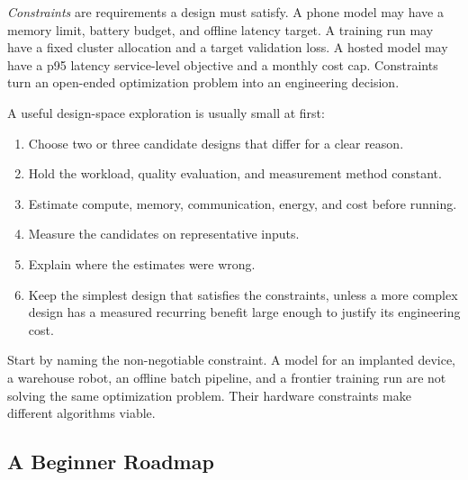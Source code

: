\emph{Constraints} are requirements a design must satisfy. A phone model may have a memory limit, battery budget, and offline latency target. A training run may have a fixed cluster allocation and a target validation loss. A hosted model may have a p95 latency service-level objective and a monthly cost cap. Constraints turn an open-ended optimization problem into an engineering decision.

A useful design-space exploration is usually small at first:

\begin{enumerate}[leftmargin=*]
  \item Choose two or three candidate designs that differ for a clear reason.
  \item Hold the workload, quality evaluation, and measurement method constant.
  \item Estimate compute, memory, communication, energy, and cost before running.
  \item Measure the candidates on representative inputs.
  \item Explain where the estimates were wrong.
  \item Keep the simplest design that satisfies the constraints, unless a more complex design has a measured recurring benefit large enough to justify its engineering cost.
\end{enumerate}

\begin{aside}
Start by naming the non-negotiable constraint. A model for an implanted device, a warehouse robot, an offline batch pipeline, and a frontier training run are not solving the same optimization problem. Their hardware constraints make different algorithms viable.
\end{aside}

\subsection{A Beginner Roadmap}


